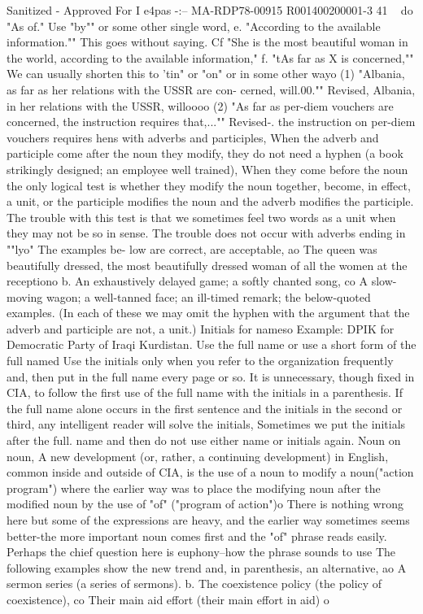 \documentclass[
    oneside,
    11pt,
    draft
]{memoir}
\begin{document}
Sanitized - Approved For I e4pas -:-- MA-RDP78-00915 R001400200001-3 41 ~ do "As of." Use "by"" or some other single word, e. "According to the available information."" This goes without saying. Cf "She is the most beautiful woman in the world, according to the available information," f. "tAs far as X is concerned,"" We can usually shorten this to 'tin" or "on" or in some other wayo (1) "Albania, as far as her relations with the USSR are con- cerned, will.00."" Revised, Albania, in her relations with the USSR, willoooo (2) "As far as per-diem vouchers are concerned, the instruction requires that,..."" Revised-. the instruction on per-diem vouchers requires hens with adverbs and participles, When the adverb and participle come after the noun they modify, they do not need a hyphen (a book strikingly designed; an employee well trained), When they come before the noun the only logical test is whether they modify the noun together, become, in effect, a unit, or the participle modifies the noun and the adverb modifies the participle. The trouble with this test is that we sometimes feel two words as a unit when they may not be so in sense. The trouble does not occur with adverbs ending in ""lyo" The examples be- low are correct, are acceptable, ao The queen was beautifully dressed, the most beautifully dressed woman of all the women at the receptiono b. An exhaustively delayed game; a softly chanted song, co A slow-moving wagon; a well-tanned face; an ill-timed remark; the below-quoted examples. (In each of these we may omit the hyphen with the argument that the adverb and participle are not, a unit.) Initials for nameso Example: DPIK for Democratic Party of Iraqi Kurdistan. Use the full name or use a short form of the full named Use the initials only when you refer to the organization frequently and, then put in the full name every page or so. It is unnecessary, though fixed in CIA, to follow the first use of the full name with the initials in a parenthesis. If the full name alone occurs in the first sentence and the initials in the second or third, any intelligent reader will solve the initials, Sometimes we put the initials after the full. name and then do not use either name or initials again. Noun on noun, A new development (or, rather, a continuing development) in English, common inside and outside of CIA, is the use of a noun to modify a noun("action program") where the earlier way was to place the modifying noun after the modified noun by the use of "of" ("program of action")o There is nothing wrong here but some of the expressions are heavy, and the earlier way sometimes seems better-the more important noun comes first and the "of" phrase reads easily. Perhaps the chief question here is euphony--how the phrase sounds to use The following examples show the new trend and, in parenthesis, an alternative, ao A sermon series (a series of sermons). b. The coexistence policy (the policy of coexistence), co Their main aid effort (their main effort in aid) o
\end{document}
